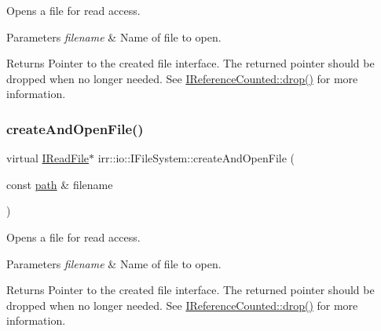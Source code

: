 Opens a file for read access. 


\begin{DoxyParams}{Parameters}
{\em filename} & Name of file to open. \\
\hline
\end{DoxyParams}
\begin{DoxyReturn}{Returns}
Pointer to the created file interface. The returned pointer should be dropped when no longer needed. See \hyperlink{classirr_1_1IReferenceCounted_a03856a09355b89d178090c4a5f738543}{I\+Reference\+Counted\+::drop()} for more information. 
\end{DoxyReturn}
\mbox{\label{classirr_1_1io_1_1IFileSystem_a3678bb77e12cc6ee2b3947f4c79f6c90}} 
\subsubsection{\texorpdfstring{create\+And\+Open\+File()}{createAndOpenFile()}\hspace{0.1cm}{\footnotesize\ttfamily [2/2]}}
{\footnotesize\ttfamily virtual \hyperlink{classirr_1_1io_1_1IReadFile}{I\+Read\+File}$\ast$ irr\+::io\+::\+I\+File\+System\+::create\+And\+Open\+File (\begin{DoxyParamCaption}\item[{const \hyperlink{namespaceirr_1_1io_a6468281622ce3a1c46b72e19f32dded5}{path} \&}]{filename }\end{DoxyParamCaption})\hspace{0.3cm}{\ttfamily [pure virtual]}}



Opens a file for read access. 


\begin{DoxyParams}{Parameters}
{\em filename} & Name of file to open. \\
\hline
\end{DoxyParams}
\begin{DoxyReturn}{Returns}
Pointer to the created file interface. The returned pointer should be dropped when no longer needed. See \hyperlink{classirr_1_1IReferenceCounted_a03856a09355b89d178090c4a5f738543}{I\+Reference\+Counted\+::drop()} for more information. 
\end{DoxyReturn}
\mbox{\label{classirr_1_1io_1_1IFileSystem_af0ed28b697936ee8aa60a5a0877ac90a}} 
